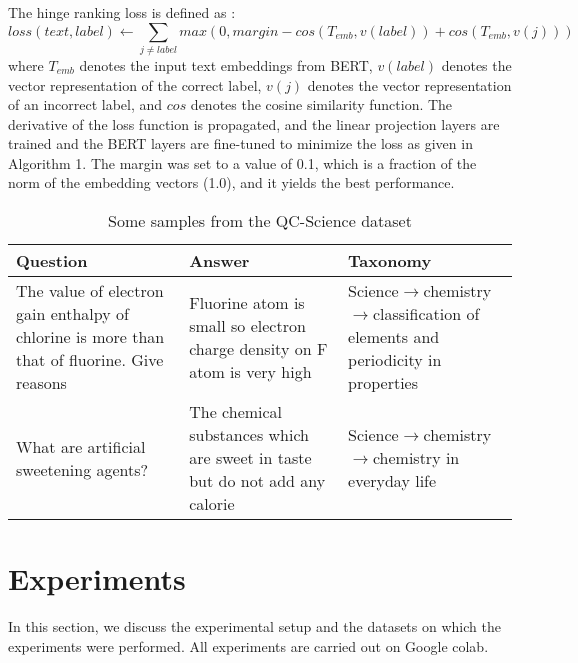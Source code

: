 \documentclass[runningheads, envcountsame, a4paper]{llncs}
\begin{document}
The hinge ranking loss is defined as :
 \[loss(text,label)\gets \sum_{j \neq label}max(0,margin-cos(T_{emb},v(label))+cos(T_{emb},v(j)))\]
 where $T_{emb}$ denotes the input text embeddings from BERT,
$v(label)$ denotes the vector representation of the correct label, $v(j)$ denotes the vector representation of an incorrect label, and $cos$ denotes the cosine similarity function. The derivative of the loss function is propagated, and the linear projection layers are trained and the BERT layers are fine-tuned to minimize the loss as given in Algorithm 1. The margin was set to a value of 0.1, which is a fraction of the norm of the embedding vectors (1.0), and it yields the best performance.
   \begin{table}
  \small
 \centering
\caption{Some samples from the QC-Science dataset}\label{tab1}
\begin{tabular}{|p{3.2cm}|p{4cm}|p{4.8cm}|}
\hline
Question &  Answer & Taxonomy\\
\hline
The value of electron gain enthalpy of chlorine is more than that of fluorine.  Give reasons &  Fluorine atom is small  so electron charge density on F atom is very high & Science$\xrightarrow{}$chemistry$\xrightarrow{}$classification of elements and periodicity in properties\\ \hline
What are artificial sweetening agents? & The chemical substances which are sweet in taste but do not add any calorie & Science$\xrightarrow{}$chemistry$\xrightarrow{}$chemistry in everyday life\\
\hline
\end{tabular}
\end{table}


 \section{Experiments}
 In this section, we discuss the experimental setup and the datasets on which the experiments were performed. All experiments are carried out on Google colab.
\end{document}
